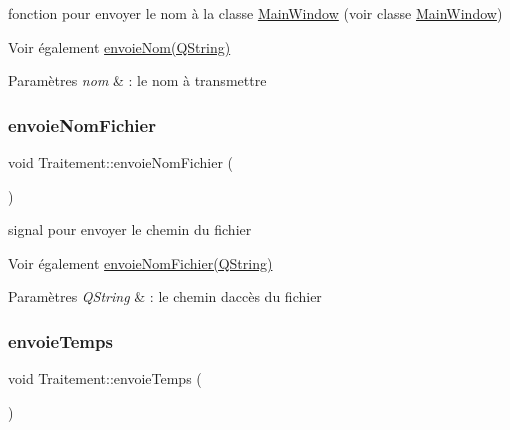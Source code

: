fonction pour envoyer le nom à la classe \hyperlink{classMainWindow}{Main\+Window} (voir classe \hyperlink{classMainWindow}{Main\+Window}) 

\begin{DoxySeeAlso}{Voir également}
\hyperlink{classTraitement_ab958dbb923cb1b905c260c4f54907169}{envoie\+Nom(\+Q\+String)} 
\end{DoxySeeAlso}

\begin{DoxyParams}{Paramètres}
{\em nom} & \+: le nom à transmettre \\
\hline
\end{DoxyParams}
\mbox{\label{classTraitement_a7a3bc123acfc8e079ef93889d47c9829}} 
\subsubsection{\texorpdfstring{envoie\+Nom\+Fichier}{envoieNomFichier}}
{\footnotesize\ttfamily void Traitement\+::envoie\+Nom\+Fichier (\begin{DoxyParamCaption}\item[{Q\+String}]{ }\end{DoxyParamCaption})\hspace{0.3cm}{\ttfamily [signal]}}



signal pour envoyer le chemin du fichier 

\begin{DoxySeeAlso}{Voir également}
\hyperlink{classTraitement_a7a3bc123acfc8e079ef93889d47c9829}{envoie\+Nom\+Fichier(\+Q\+String)} 
\end{DoxySeeAlso}

\begin{DoxyParams}{Paramètres}
{\em Q\+String} & \+: le chemin d\textquotesingle{}accès du fichier \\
\hline
\end{DoxyParams}
\mbox{\label{classTraitement_ae57543af34e05b74a7af460c0e74e87f}} 
\subsubsection{\texorpdfstring{envoie\+Temps}{envoieTemps}}
{\footnotesize\ttfamily void Traitement\+::envoie\+Temps (\begin{DoxyParamCaption}\item[{Q\+String}]{ }\end{DoxyParamCaption})\hspace{0.3cm}{\ttfamily [signal]}}



